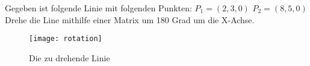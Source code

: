 \documentclass[../../main.tex]{subfiles}
\begin{document}
Gegeben ist folgende Linie mit folgenden Punkten:
$P_1 = (2, 3, 0)$
$P_2 = (8, 5, 0)$ \\
Drehe die Line mithilfe einer Matrix um 180 Grad um die X-Achse.


\begin{figure}[h]
    \centering
    \texttt{[image: rotation]}
    \caption{Die zu drehende Linie}
    \label{fig:rotation}
\end{figure}
\end{document}
